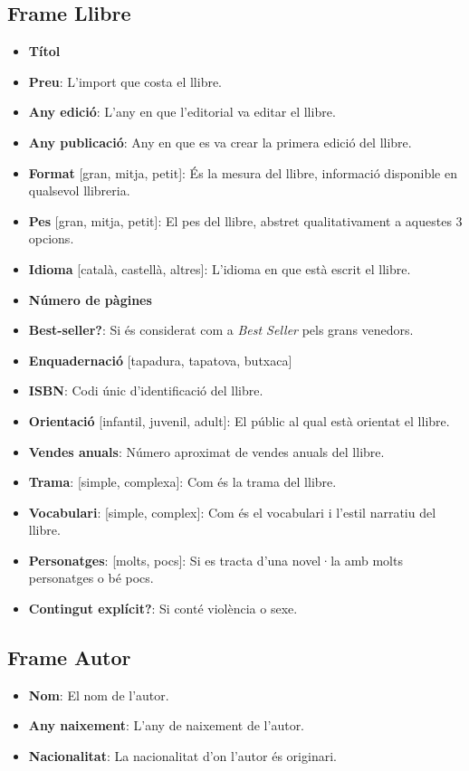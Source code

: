 \subsection{Frame Llibre}
\begin{itemize}
  \item \textbf{Títol}
  \item \textbf{Preu}: L'import que costa el llibre.
  \item \textbf{Any edició}: L'any en que l'editorial va editar el llibre.
  \item \textbf{Any publicació}: Any en que es va crear la primera edició del llibre.
  \item \textbf{Format} [gran, mitja, petit]: És la mesura del llibre, informació disponible en qualsevol llibreria.
  \item \textbf{Pes} [gran, mitja, petit]: El pes del llibre, abstret qualitativament a aquestes 3 opcions.
  \item \textbf{Idioma} [català, castellà, altres]: L'idioma en que està escrit el llibre.
  \item \textbf{Número de pàgines}
  \item \textbf{Best-seller?}: Si és considerat com a \emph{Best Seller} pels grans venedors.
  \item \textbf{Enquadernació} [tapadura, tapatova, butxaca]
  \item \textbf{ISBN}: Codi únic d'identificació del llibre.
  \item \textbf{Orientació} [infantil, juvenil, adult]: El públic al qual està orientat el llibre.
  \item \textbf{Vendes anuals}: Número aproximat de vendes anuals del llibre.
  \item \textbf{Trama}: [simple, complexa]: Com és la trama del llibre.
  \item \textbf{Vocabulari}: [simple, complex]: Com és el vocabulari i l'estil narratiu del llibre.
  \item \textbf{Personatges}: [molts, pocs]: Si es tracta d'una novel·la amb molts personatges o bé pocs.
  \item \textbf{Contingut explícit?}: Si conté violència o sexe.
\end{itemize}

\subsection{Frame Autor}

\begin{itemize}
\item \textbf{Nom}: El nom de l'autor.
\item \textbf{Any naixement}: L'any de naixement de l'autor.
\item \textbf{Nacionalitat}: La nacionalitat d'on l'autor és originari.
\end{itemize}

